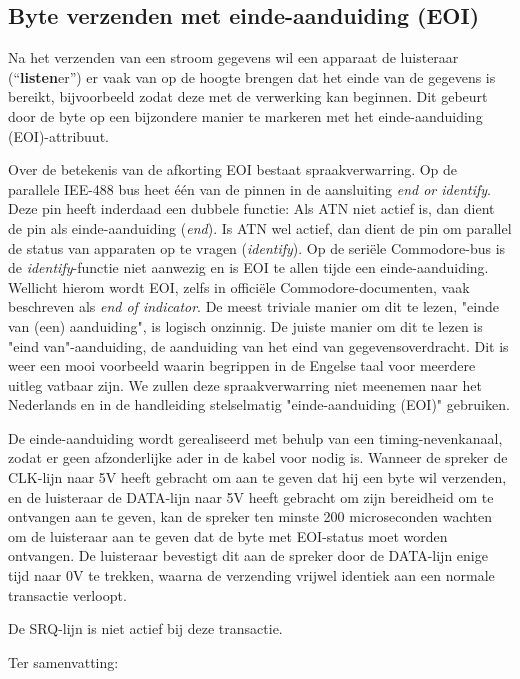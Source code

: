\subsection{Byte verzenden met einde-aanduiding (EOI)}

Na het verzenden van een stroom gegevens wil een apparaat de luisteraar (``\textbf{listen}er'') er vaak van op de hoogte brengen dat het einde van de gegevens is bereikt, bijvoorbeeld zodat deze met de verwerking kan beginnen.  Dit gebeurt door de byte op een bijzondere manier te markeren met het einde-aanduiding (EOI)-attribuut.

Over de betekenis van de afkorting EOI bestaat spraakverwarring. Op de parallele IEE-488 bus heet één van de pinnen in de aansluiting {\em end or identify}. Deze pin heeft inderdaad een dubbele functie: Als ATN niet actief is, dan dient de pin als einde-aanduiding ({\em end}). Is ATN wel actief, dan dient de pin om parallel de status van apparaten op te vragen ({\em identify}). Op de seriële Commodore-bus is de {\em identify}-functie niet aanwezig en is EOI te allen tijde een einde-aanduiding. Wellicht hierom wordt EOI, zelfs in officiële Commodore-documenten, vaak beschreven als {\em end of indicator}.
De meest triviale manier om dit te lezen, "einde van (een) aanduiding", is logisch onzinnig. De juiste manier om dit te lezen is "eind van"-aanduiding, de aanduiding van het eind van gegevensoverdracht. Dit is weer een mooi voorbeeld waarin begrippen in de Engelse taal voor meerdere uitleg vatbaar zijn. We zullen deze spraakverwarring niet meenemen naar het Nederlands en in de handleiding stelselmatig "einde-aanduiding (EOI)" gebruiken.

De einde-aanduiding wordt gerealiseerd met behulp van een timing-nevenkanaal, zodat er geen afzonderlijke ader in de kabel voor nodig is. Wanneer de spreker de CLK-lijn naar 5V heeft gebracht om aan te geven dat hij een byte wil verzenden, en de luisteraar de DATA-lijn naar 5V heeft gebracht om zijn bereidheid om te ontvangen aan te geven, kan de spreker ten minste 200 microseconden wachten om de luisteraar aan te geven dat de byte met EOI-status moet worden ontvangen.  De luisteraar bevestigt dit aan de spreker door de DATA-lijn enige tijd naar 0V te trekken, waarna de verzending vrijwel identiek aan een normale transactie verloopt.

De SRQ-lijn is niet actief bij deze transactie.

Ter samenvatting:

